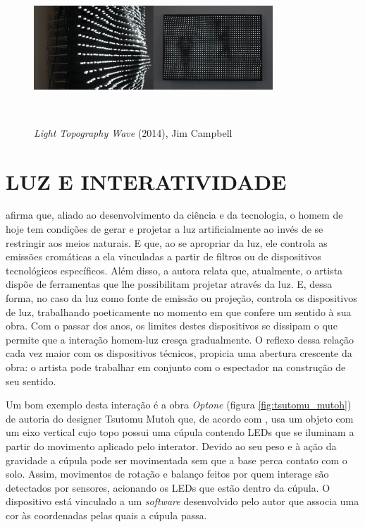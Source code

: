 \begin{figure}[H]
  \begin{center}
    \caption{\textit{Light Topography Wave} (2014), Jim Campbell}
    \vspace*{0,2cm}
    \includegraphics[width=0.8\textwidth]{./04-figuras/jim_campbell}
    \label{fig:jim_campbell}
  \end{center}
  \vspace*{-0,9cm}
  \\
\end{figure}


\section{LUZ E INTERATIVIDADE}

 afirma que, aliado ao desenvolvimento da ciência e da tecnologia, o homem de hoje tem condições de gerar e projetar a luz artificialmente ao invés de se restringir aos meios naturais. E que, ao se apropriar da luz, ele controla as emissões cromáticas a ela vinculadas a partir de filtros ou de dispositivos tecnológicos específicos. Além disso, a autora relata que, atualmente, o artista dispõe de ferramentas que lhe possibilitam projetar através da luz. E, dessa forma, no caso da luz como fonte de emissão ou projeção, controla os dispositivos de luz, trabalhando poeticamente no momento em que confere um sentido à sua obra. Com o passar dos anos, os limites destes dispositivos se dissipam o que permite que a interação homem-luz cresça gradualmente. O reflexo dessa relação cada vez maior com os dispositivos técnicos, propicia uma abertura crescente da obra: o artista pode trabalhar em conjunto com o espectador na construção de seu sentido.


Um bom exemplo desta interação é a obra \textit{Optone} (figura \ref{fig:tsutomu_mutoh}) de autoria do designer Tsutomu Mutoh que, de acordo com , usa um objeto com um eixo vertical cujo topo possui uma cúpula contendo LEDs que se iluminam a partir do movimento aplicado pelo interator. Devido ao seu peso e à ação da gravidade a cúpula pode ser movimentada sem que a base perca contato com o solo. Assim, movimentos de rotação e balanço feitos por quem interage são detectados por sensores, acionando os LEDs que estão dentro da cúpula. O dispositivo está vinculado a um \textit{software} desenvolvido pelo autor que associa uma cor às coordenadas pelas quais a cúpula passa.

